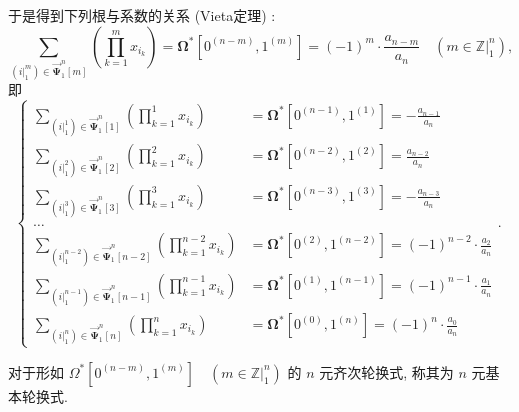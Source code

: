 \documentclass{article}
\renewcommand\.{.\hspace{3pt}}
\renewcommand\,{,\hspace{4pt}}
\renewcommand\:{:\hspace{3pt}}
\begin{document}
	于是得到下列根与系数的关系 (Vieta定理) \:
	\begin{equation*}
		\sum_{\left( i |_{1}^{m} \right) \in \bm{\vec{\Psi}}_{1}^{n} \left[ m \right]} \left( \prod_{k=1}^{m} x_{i_{k}} \right) = \bm{\Omega^{\ast}} \left[ 0^{\left( n-m \right)} , 1^{\left( m \right)} \right] = (-1)^{m} \cdot \frac{a_{n-m}}{a_{n}} \quad \left( m \in \mathbb{Z} |_{1}^{n} \right) \,
	\end{equation*}
	即
	\begin{equation}
		\left\{
		\begin{aligned}
		\sum_{\left( i |_{1}^{1} \right) \in \bm{\vec{\Psi}}_{1}^{n} \left[ 1 \right]} \left( \prod_{k=1}^{1} x_{i_{k}} \right) & = \bm{\Omega^{\ast}} \left[ 0^{\left( n-1 \right)} , 1^{\left( 1 \right)} \right] = - \frac{a_{n-1}}{a_{n}} \\
		\sum_{\left( i |_{1}^{2} \right) \in \bm{\vec{\Psi}}_{1}^{n} \left[ 2 \right]} \left( \prod_{k=1}^{2} x_{i_{k}} \right) & = \bm{\Omega^{\ast}} \left[ 0^{\left( n-2 \right)} , 1^{\left( 2 \right)} \right] = \frac{a_{n-2}}{a_{n}} \\
		\sum_{\left( i |_{1}^{3} \right) \in \bm{\vec{\Psi}}_{1}^{n} \left[ 3 \right]} \left( \prod_{k=1}^{3} x_{i_{k}} \right) & = \bm{\Omega^{\ast}} \left[ 0^{\left( n-3 \right)} , 1^{\left( 3 \right)} \right] = - \frac{a_{n-3}}{a_{n}} \\
		\ldots \\
		\sum_{\left( i |_{1}^{n-2} \right) \in \bm{\vec{\Psi}}_{1}^{n} \left[ n-2 \right]} \left( \prod_{k=1}^{n-2} x_{i_{k}} \right) & = \bm{\Omega^{\ast}} \left[ 0^{\left( 2 \right)} , 1^{\left( n-2 \right)} \right] = (-1)^{n-2} \cdot \frac{a_{2}}{a_{n}} \\
		\sum_{\left( i |_{1}^{n-1} \right) \in \bm{\vec{\Psi}}_{1}^{n} \left[ n-1 \right]} \left( \prod_{k=1}^{n-1} x_{i_{k}} \right) & = \bm{\Omega^{\ast}} \left[ 0^{\left( 1 \right)} , 1^{\left( n-1 \right)} \right] = (-1)^{n-1} \cdot \frac{a_{1}}{a_{n}} \\
		\sum_{\left( i |_{1}^{n} \right) \in \bm{\vec{\Psi}}_{1}^{n} \left[ n \right]} \left( \prod_{k=1}^{n} x_{i_{k}} \right) & = \bm{\Omega^{\ast}} \left[ 0^{\left( 0 \right)} , 1^{\left( n \right)} \right] = (-1)^{n} \cdot \frac{a_{0}}{a_{n}}
		\end{aligned}
		\right. \.
	\end{equation}
	
	对于形如 $\Omega^{\ast} \left[ 0^{\left( n-m \right)} , 1^{\left( m \right)} \right] \quad \left( m \in \mathbb{Z} |_{1}^{n} \right)$ 的 $n$ 元齐次轮换式\, 称其为 $n$ 元基本轮换式\.
	
\end{document}
